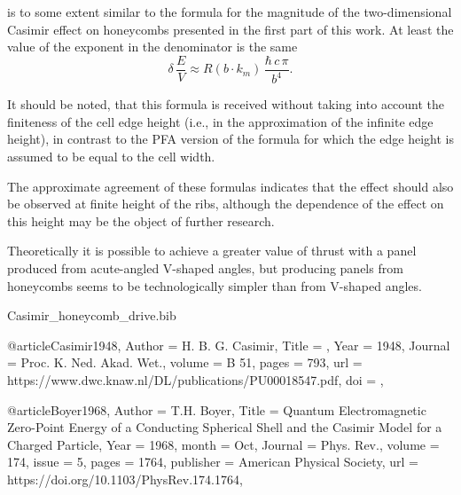 \documentclass[twoside, 10pt, ptm]{article}
\def\myfilename{Casimir_honeycomb_drive}
\begin{document}
\begin{multicols}{2}
is to some extent similar to the formula for the magnitude of the
two-dimensional Casimir effect on honeycombs presented in the first part
of this work. At least the value of the exponent in the denominator is
the same
\noindent
\begin{equation}\delta\,\frac{E}{V} \approx R\left(b \cdot k_m\right)\,\frac{\hbar\,c\,\pi}{b^4}.\end{equation}

It should be noted, that this formula is received without taking
into account the finiteness of the cell edge height (i.e., in
the approximation of the infinite edge height), in contrast to the PFA
version of the formula for which the edge height is assumed to be equal
to the cell width.

The approximate agreement of these formulas indicates that the
effect should also be observed at finite height of the ribs, although
the dependence of the effect on this height may be the object of further
research.

Theoretically it is possible to achieve a greater value of thrust with a
panel produced from acute-angled \mbox{V-shaped} angles, but producing
panels from honeycombs seems to be technologically simpler than
from \mbox{V-shaped} angles.


\begin{filecontents}{\myfilename.bib}


@article{Casimir1948,
    Author = {H. B. G. Casimir},
    Title = {},
    Year = {1948},
    Journal = {Proc. K. Ned. Akad. Wet.},
    volume = {B 51},
    pages = {793},
    url = {https://www.dwc.knaw.nl/DL/publications/PU00018547.pdf},
    doi = {},
}


@article{Boyer1968,
    Author = {T.H. Boyer},
    Title = {Quantum Electromagnetic Zero-Point Energy of a Conducting Spherical Shell and the Casimir Model for a Charged Particle},
    Year = {1968},
    month = {Oct},
    Journal = {Phys. Rev.},
    volume = {174},
    issue = {5},
    pages = {1764},
    publisher = {American Physical Society},
    url = {https://doi.org/10.1103/PhysRev.174.1764},
}


\end{filecontents}
\end{multicols}
\end{document}
